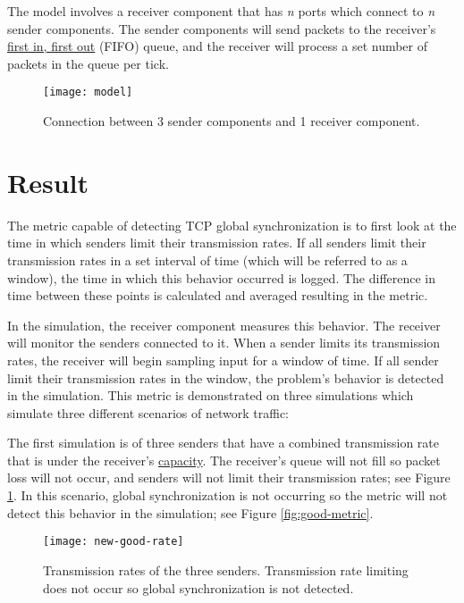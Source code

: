 \documentclass{article}
\newcommand{\plotsize}{0.23}
\begin{document}
The model involves a receiver component that has \textit{n} ports which connect to \textit{n} sender components. The sender components will send packets to the receiver's \href{https://en.wikipedia.org/wiki/FIFO_(computing_and_electronics)}{first in, first out} (FIFO) queue, and the receiver will process a set number of packets in the queue per tick. 

\begin{figure}[H]
	\centering
	\texttt{[image: model]}
	\caption{Connection between 3 sender components and 1 receiver component.}
\end{figure}

\section{Result} %

The metric capable of detecting TCP global synchronization is to first look at the time in which senders limit their transmission rates. If all senders limit their transmission rates in a set interval of time (which will be referred to as a window), the time in which this behavior occurred is logged. The difference in time between these points is calculated and averaged resulting in the metric.
						
In the simulation, the receiver component measures this behavior. The receiver will monitor the senders connected to it. When a sender limits its transmission rates, the receiver will begin sampling input for a window of time. If all sender limit their transmission rates in the window, the problem's behavior is detected in the simulation. This metric is demonstrated on three simulations which simulate three different scenarios of network traffic:
											
The first simulation is of three senders that have a combined transmission rate that is under the receiver's \href{https://www.solarwinds.com/resources/it-glossary/network-capacity}{capacity}. The receiver's queue will not fill so packet loss will not occur, and senders will not limit their transmission rates; see Figure \ref{fig:good-rate}. In this scenario, global synchronization is not occurring so the metric will not detect this behavior in the simulation; see Figure \ref{fig:good-metric}.
	
\begin{figure}[H]
	\centering
	\texttt{[image: new-good-rate]}
	\caption{Transmission rates of the three senders. Transmission rate limiting does not occur so global synchronization is not detected.}
	\label{fig:good-rate}
\end{figure}
\end{document}
